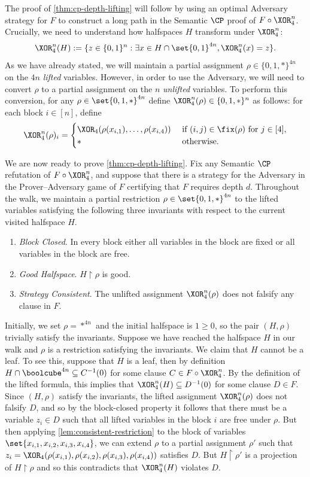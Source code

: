 \documentclass[11pt]{article}
\begin{document}
The proof of \autoref{thm:cp-depth-lifting} will follow by using an optimal Adversary strategy for $F$ to construct a long path in the Semantic $\CP$ proof of $F \circ \XOR_4^n$.
Crucially, we need to understand how halfspaces $H$ transform under $\XOR_4^n$:
\[ \XOR_4^n(H):= \{z \in \{0,1\}^n : \exists x \in H \cap \set{0,1}^{4n}, \XOR^n_4(x) = z\}. \]
As we have already stated, we will maintain a partial assignment $\rho \in \{0,1,*\}^{4n}$ on the $4n$ \emph{lifted} variables.
However, in order to use the Adversary, we will need to convert $\rho$ to a partial assignment on the $n$ \emph{unlifted} variables.
To perform this conversion, for any $\rho \in \set{0,1,*}^{4n}$ define $\XOR_4^n(\rho) \in \{0,1,*\}^n$ as follows: for each block $i \in [n]$, define \[ \XOR^n_4(\rho)_i  = \begin{cases}
		\XOR_4(\rho(x_{i,1}),\ldots, \rho(x_{i, 4})) &\mbox{ if $(i,j) \in \fix(\rho)$ for $j \in [4]$}, \\
 		* &\mbox{ otherwise}.
 \end{cases}
 \]

We are now ready to prove \autoref{thm:cp-depth-lifting}.
Fix any Semantic $\CP$ refutation of $F \circ \XOR_4^n$, and suppose that there is a strategy for the Adversary in the Prover--Adversary game of $F$ certifying that $F$ requires depth $d$.
Throughout the walk, we maintain a partial restriction $\rho \in \set{0,1,*}^{4n}$ to the lifted variables satisfying the following three invariants with respect to the current visited halfspace $H$. 
\begin{enumerate}
	\item[--] \emph{Block Closed}. In every block either all variables in the block are fixed or all variables in the block are free.
	\item[--] \emph{Good Halfspace}. $H \restriction \rho$ is good.
	\item[--] \emph{Strategy Consistent}. The unlifted assignment $\XOR_4^n(\rho)$ does not falsify any clause in $F$.
\end{enumerate}
%
%
%
%
%
%
%
%
Initially, we set $\rho = *^{4n}$ and the initial halfspace is $1 \geq 0$, so the pair $(H, \rho)$ trivially satisfy the invariants.
Suppose we have reached the halfspace $H$ in our walk and $\rho$ is a restriction satisfying the invariants.
We claim that $H$ cannot be a leaf.
To see this, suppose that $H$ is a leaf, then by definition $H \cap \boolcube^{4n} \subseteq C^{-1}(0)$ for some clause $C \in F \circ \XOR^n_4$. 
By the definition of the lifted formula, this implies that $\XOR^n_4(H) \subseteq D^{-1}(0)$ for some clause $D \in F$.
Since $(H, \rho)$ satisfy the invariants, the lifted assignment $\XOR_4^n(\rho)$ does not falsify $D$, and so by the block-closed property it follows that there must be a variable $z_i \in D$ such that all lifted variables in the block $i$ are free under $\rho$.
But then applying \autoref{lem:consistent-restriction} to the block of variables $\set{x_{i,1}, x_{i,2}, x_{i,3}, x_{i,4}}$, we can extend $\rho$ to a partial assignment $\rho'$ such that $z_i = \XOR_4(\rho(x_{i,1}), \rho(x_{i,2}), \rho(x_{i,3}), \rho(x_{i,4}))$ satisfies $D$.
But $H \restriction \rho'$ is a projection of $H \restriction \rho$ and so this contradicts that $\XOR^n_4(H)$ violates $D$.
\end{document}
